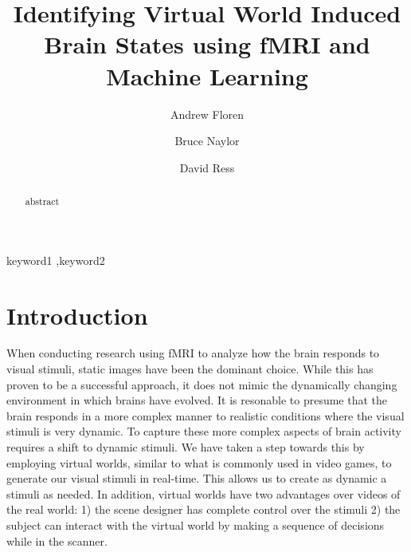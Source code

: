 \documentclass[preprint,5p,authoryear]{elsarticle}
\begin{document}
\begin{frontmatter}

\title{Identifying Virtual World Induced Brain States using fMRI and Machine Learning}

\author[UT]{Andrew Floren}

\author[UT]{Bruce Naylor}

\author[UT]{David Ress}

\address[UT]{The University of Texas at Austin, Austin, TX 78712 USA}


\begin{abstract}
abstract
\end{abstract}

\begin{keyword}
keyword1 \sep keyword2
\end{keyword}

\end{frontmatter}

\section{Introduction}
When conducting research using fMRI to analyze how the brain responds to visual stimuli, static images have been  the dominant choice.
While this has proven to be a successful approach, it does not mimic the dynamically changing environment in which brains have evolved.
It is resonable to presume that the brain responds in a more complex manner to realistic conditions where the visual stimuli is very dynamic.
To capture these more complex aspects of brain activity requires a shift to dynamic stimuli.
We have taken a step towards this by employing virtual worlds, similar to what is commonly used in video games, to generate our visual stimuli in real-time.
This allows us to create as dynamic a stimuli as needed.
In addition, virtual worlds have two advantages over videos of the real world: 1) the scene designer has complete control over the stimuli 2) the subject can interact with the virtual world by making a sequence of decisions while in the scanner.
\end{document}

